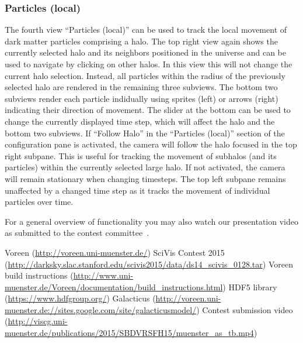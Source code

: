 \documentclass[
    fontsize=12pt,
    paper=a4,
    pagesize=auto,
    parskip=false,
    titlepage=on,
    english
]{scrartcl}
\begin{document}
\subsubsection{Particles (local)}
The fourth view ``Particles (local)'' can be used to track the local movement of dark matter particles comprising a halo.
The top right view again shows the currently selected halo and its neighbors positioned in the universe and can be used to navigate by clicking on other halos.
In this view this will not change the current halo selection.
Instead, all particles within the radius of the previously selected halo are rendered in the remaining three subviews.
The bottom two subviews render each particle indidually using sprites (left) or arrows (right) indicating their direction of movement.
The slider at the bottom can be used to change the currently displayed time step, which will affect the halo and the bottom two subviews.
If ``Follow Halo'' in the ``Particles (local)'' section of the configuration pane is activated, the camera will follow the halo focused in the top right subpane.
This is useful for tracking the movement of subhalos (and its particles) within the currently selected large halo.
If not activated, the camera will remain stationary when changing timesteps.
The top left subpane remains unaffected by a changed time step as it tracks the movement of individual particles over time.

For a general overview of functionality you may also watch our presentation video as submitted to the contest committee~\cite{contestvid}.

\begin{thebibliography}{9}
     Voreen (\url{http://voreen.uni-muenster.de/})
     SciVis Contest 2015 (\url{http://darksky.slac.stanford.edu/scivis2015/data/ds14_scivis_0128.tar})
     Voreen build instructions (\url{http://www.uni-muenster.de/Voreen/documentation/build_instructions.html})
     HDF5 library (\url{https://www.hdfgroup.org/})
     Galacticus (\url{http://voreen.uni-muenster.de://sites.google.com/site/galacticusmodel/})
     Contest submission video (\url{http://viscg.uni-muenster.de/publications/2015/SBDVRSFH15/muenster_as_tb.mp4})
\end{thebibliography}
\end{document}

